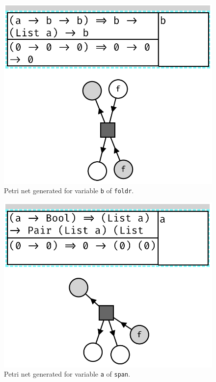 \documentclass[11pt,openright,hidelinks,a4paper]{article}
\begin{document}
\begin{figure}[H]
\begin{center}
\includegraphics[scale=0.45]{foldr}
\end{center}
\caption{Petri net generated for variable \lstinline{b} of \lstinline{foldr}.}
\label{fig:foldr}
\end{figure}

\begin{figure}[H]
\begin{center}
\includegraphics[scale=0.45]{span}
\end{center}
\caption{Petri net generated for variable \lstinline{a} of \lstinline{span}.}
\label{fig:foldr}
\end{figure}
\end{document}
